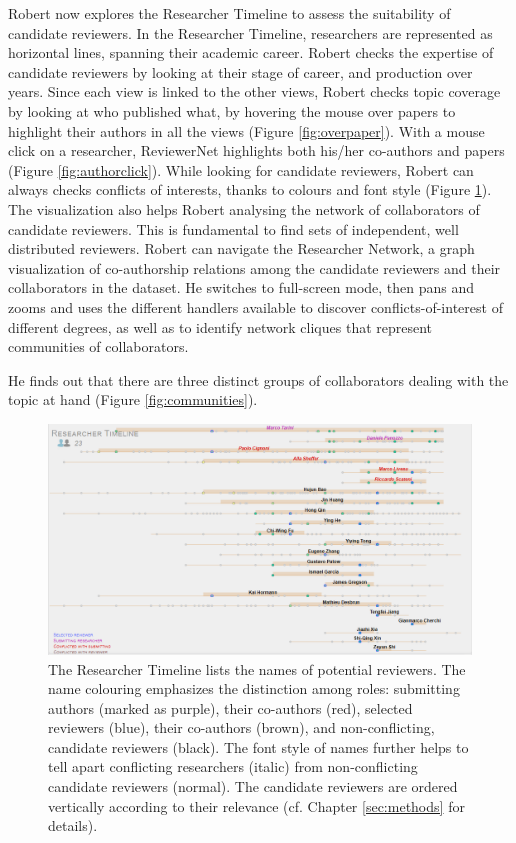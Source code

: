 Robert now explores the Researcher Timeline to assess the suitability of candidate reviewers. In the Researcher Timeline, researchers are represented as horizontal lines, spanning their academic career. Robert checks the expertise of candidate reviewers by looking at their stage of career, and production over years. Since each view is linked to the other views, Robert checks topic coverage by looking at who published what, by hovering the mouse over papers to highlight their authors in all the views (Figure \ref{fig:overpaper}). With a mouse click on a researcher, ReviewerNet highlights both his/her co-authors and papers (Figure \ref{fig:authorclick}).
While looking for candidate reviewers, Robert can always checks conflicts of interests, thanks to colours and font style (Figure \ref{fig:selected}). The visualization also helps Robert analysing the network of collaborators of candidate reviewers. This is fundamental to find sets of independent, well distributed reviewers. Robert can navigate the Researcher Network, a graph visualization of co-authorship relations among the candidate reviewers and their collaborators in the dataset. He switches to full-screen mode, then pans and zooms and uses the different handlers available to discover conflicts-of-interest of different degrees, as well as to identify network cliques that represent communities of collaborators. 

He finds out that there are three distinct groups of collaborators dealing with the topic at hand (Figure \ref{fig:communities}).

\begin{figure}[!ht]
    \centering
    \includegraphics[width=\textwidth]{fig/timeline_cropped.png}
    \caption{The Researcher Timeline lists the names of potential reviewers. The name colouring emphasizes the distinction among roles: submitting authors (marked as purple), their co-authors (red), selected reviewers (blue), their co-authors (brown), and non-conflicting, candidate reviewers (black). The font style of names further helps to tell apart conflicting researchers (italic) from non-conflicting candidate reviewers (normal). The candidate reviewers are ordered vertically according to their relevance (cf. Chapter \ref{sec:methods} for details).}%
    \label{fig:selected}
\end{figure}

